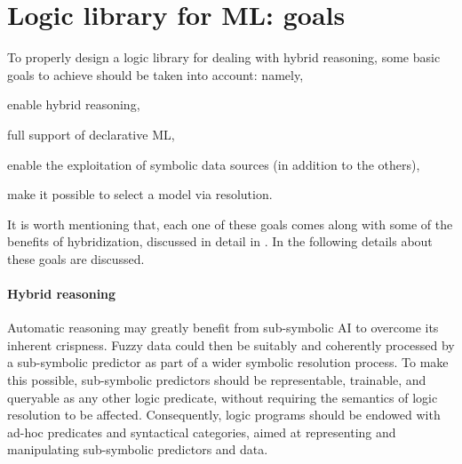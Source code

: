 \documentclass{article}
\begin{document}
%

\section{Logic library for ML: goals}\label{sec:goals}

To properly design a logic library for dealing with hybrid reasoning, some basic goals to achieve should be taken into account: namely,
%
\begin{inlinelist}
    \item enable hybrid reasoning,
    \item full support of declarative ML,
    \item enable the exploitation of symbolic data sources (in addition to the others),
    \item make it possible to select a model via resolution.
\end{inlinelist}
%
It is worth mentioning that, each one of these goals comes along with some of the benefits of hybridization, discussed in detail in \cite{xaisurvey-ia14}.
%
In the following details about these goals are discussed.

\paragraph{Hybrid reasoning}
%
Automatic reasoning may greatly benefit from sub-symbolic AI to overcome its inherent crispness.
%
Fuzzy data could then be suitably and coherently processed by a sub-symbolic predictor as part of a wider symbolic resolution process.
%
To make this possible, sub-symbolic predictors should be representable, trainable, and queryable as any other logic predicate, without requiring the semantics of logic resolution to be affected.
%
Consequently, logic programs should be endowed with ad-hoc predicates and syntactical categories, aimed at representing and manipulating sub-symbolic predictors and data.
\end{document}
